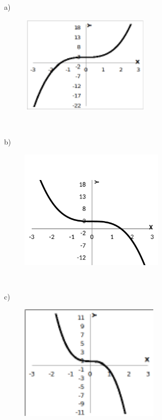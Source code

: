 \begin{respostas}{4}

	\ansitem{} a)

	\begin{figure}[H]
		\begin{Center}
			\includegraphics[width=2.45in,height=1.85in]{capitulos/outras_funcoes/media/image60.pdf}
		\end{Center}
	\end{figure}

~~

	b)

	\begin{figure}[H]
		\begin{Center}
			\includegraphics[width=2.71in,height=2.25in]{capitulos/outras_funcoes/media/image61.pdf}
		\end{Center}
	\end{figure}

~~

	c)

	\begin{figure}[H]
		\begin{Center}
			\includegraphics[width=2.61in,height=2.17in]{capitulos/outras_funcoes/media/image62.pdf}
		\end{Center}
	\end{figure}


\end{respostas}
